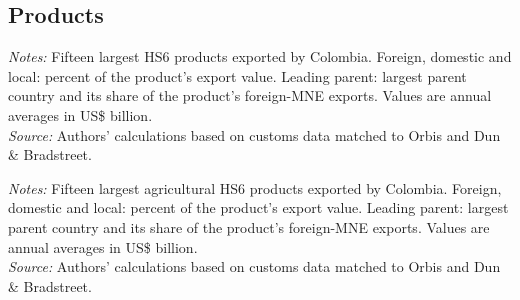 \documentclass[11pt,a4paper]{article}
\begin{document}
\subsection{Products}
\begin{table}[H]\centering\footnotesize%
  \caption{Colombia: Fifteen Largest Export Products}%
  \label{tab:c_hs6_COL}%
  \par\vspace{3pt}%
  \begin{minipage}{0.95\textwidth}\footnotesize %
  \textit{Notes:} Fifteen largest HS6 products exported by Colombia. Foreign, domestic and local: percent of the product's export value. Leading parent: largest parent country and its share of the product's foreign-MNE exports. Values are annual averages in US\$ billion.\\[3pt]%
  \textit{Source:} Authors' calculations based on customs data matched to Orbis and Dun \& Bradstreet.%
  \end{minipage}%
  \end{table}
\begin{table}[H]\centering\footnotesize%
  \caption{Colombia, Agriculture: Fifteen Largest Export Products}%
  \label{tab:c_hs6_COL_agro}%
  \par\vspace{3pt}%
  \begin{minipage}{0.95\textwidth}\footnotesize %
  \textit{Notes:} Fifteen largest agricultural HS6 products exported by Colombia. Foreign, domestic and local: percent of the product's export value. Leading parent: largest parent country and its share of the product's foreign-MNE exports. Values are annual averages in US\$ billion.\\[3pt]%
  \textit{Source:} Authors' calculations based on customs data matched to Orbis and Dun \& Bradstreet.%
  \end{minipage}%
  \end{table}
\end{document}
